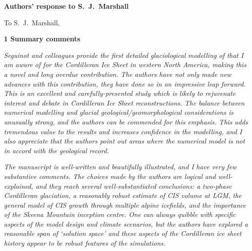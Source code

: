 \documentclass[10pt]{article}
\begin{document}
\textbf{Authors' response to S.~J.~Marshall}
\bigskip


\newcommand{\doi}[1]{doi:\allowbreak\href{http://dx.doi.org/#1}{#1}}
\newcommand{\sechead}[1]{\bigskip\noindent\textbf{#1}}
\newcommand{\referee}[1]{\bigskip\textcolor{journalname}{\textit{#1}}}
\newcommand{\msquote}[1]{\begin{quote}\textit{#1}\end{quote}}
\newcommand{\todo}[1]{\textcolor{darkred}{TODO: #1}}

To S.~J.~Marshall,


\sechead{1 \quad Summary comments}

\referee{%
    Seguinot and colleagues provide the first detailed glaciological modelling
    of that I am aware of for the Cordilleran Ice Sheet in western North
    America, making this a novel and long overdue contribution. The authors
    have not only made new advances with this contribution, they have done so
    in an impressive leap forward. This is an excellent and carefully-presented
    study which is likely to rejuvenate interest and debate in Cordilleran Ice
    Sheet reconstructions. The balance between numerical modelling and glacial
    geological/geomorphological considerations is unusually strong, and the
    authors can be commended for this emphasis. This adds tremendous value to
    the results and increases confidence in the modelling, and I also
    appreciate that the authors point out areas where the numerical model is
    not in accord with the geological record.}

\referee{%
    The manuscript is well-written and beautifully illustrated, and I have very
    few substantive comments. The choices made by the authors are logical and
    well-explained, and they reach several well-substantiated conclusions: a
    two-phase Cordilleran glaciation, a reasonably robust estimate of CIS
    volume at LGM, the general model of CIS growth through multiple alpine
    icefields, and the importance of the Skeena Mountain inception centre. One
    can always quibble with specific aspects of the model design and climate
    scenarios, but the authors have explored a reasonable span of `solution
    space' and these aspects of the Cordilleran ice sheet history appear to be
    robust features of the simulations.}
\end{document}
